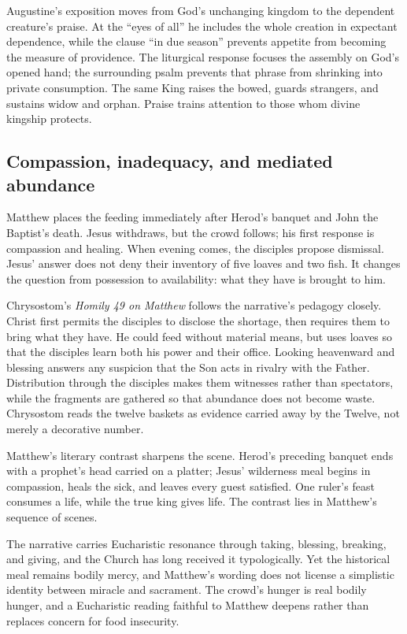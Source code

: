 Augustine's exposition moves from God's unchanging kingdom to the dependent
creature's praise. At the ``eyes of all'' he includes the whole creation in
expectant dependence, while the clause ``in due season'' prevents appetite
from becoming the measure of providence. The liturgical response focuses the
assembly on God's opened hand; the surrounding psalm prevents that phrase
from shrinking into private consumption. The same King raises the bowed,
guards strangers, and sustains widow and orphan. Praise trains attention to
those whom divine kingship protects.

\subsection*{Compassion, inadequacy, and mediated abundance\enspace{}}
Matthew places the feeding immediately after Herod's banquet and John the Baptist's death. Jesus withdraws, but the crowd follows; his first response is compassion and healing. When evening comes, the disciples propose dismissal. Jesus' answer does not deny their inventory of five loaves and two fish. It changes the question from possession to availability: what they have is brought to him.

Chrysostom's \emph{Homily 49 on Matthew} follows the narrative's pedagogy
closely. Christ first permits the disciples to disclose the shortage, then
requires them to bring what they have. He could feed without material means,
but uses loaves so that the disciples learn both his power and their office.
Looking heavenward and blessing answers any suspicion that the Son acts in
rivalry with the Father. Distribution through the disciples makes them
witnesses rather than spectators, while the fragments are gathered so that
abundance does not become waste. Chrysostom reads the twelve baskets as
evidence carried away by the Twelve, not merely a decorative number.

Matthew's literary contrast sharpens the scene. Herod's preceding banquet
ends with a prophet's head carried on a platter; Jesus' wilderness meal begins
in compassion, heals the sick, and leaves every guest satisfied. One ruler's
feast consumes a life, while the true king gives life. The contrast lies in Matthew's sequence of scenes.

The narrative carries Eucharistic resonance through taking, blessing, breaking, and giving, and the Church has long received it typologically. Yet the historical meal remains bodily mercy, and Matthew's wording does not license a simplistic identity between miracle and sacrament. The crowd's hunger is real bodily hunger, and a Eucharistic reading faithful to Matthew deepens rather than replaces concern for food insecurity.

